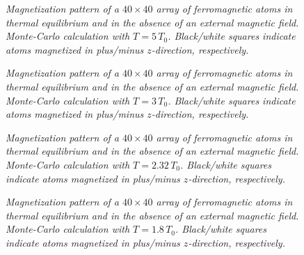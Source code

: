 \begin{figure}
\epsfysize=2in
\centerline{}
\caption{\em   Magnetization pattern of a $40\times 40$ array of ferromagnetic atoms in thermal
equilibrium and in the absence of an external magnetic field. Monte-Carlo calculation with $T=5\,T_0$.
Black/white squares indicate atoms magnetized in plus/minus $z$-direction, respectively.}
\end{figure}

\begin{figure}
\epsfysize=2in
\centerline{}
\caption{\em  Magnetization pattern of a $40\times 40$ array of ferromagnetic atoms in thermal
equilibrium and in the absence of an external magnetic field. Monte-Carlo calculation with $T=3\,T_0$.
Black/white squares indicate atoms magnetized in plus/minus $z$-direction, respectively.}
\end{figure}

\begin{figure}
\epsfysize=2in
\centerline{}
\caption{\em    Magnetization pattern of a $40\times 40$ array of ferromagnetic atoms in thermal
equilibrium and in the absence of an external magnetic field. Monte-Carlo calculation with $T=2.32\,T_0$.
Black/white squares indicate atoms magnetized in plus/minus $z$-direction, respectively.}
\end{figure}

\begin{figure}
\epsfysize=2in
\centerline{}
\caption{\em   Magnetization pattern of a $40\times 40$ array of ferromagnetic atoms in thermal
equilibrium and in the absence of an external magnetic field. Monte-Carlo calculation with $T=1.8\,T_0$.
Black/white squares indicate atoms magnetized in plus/minus $z$-direction, respectively.}\label{image5}
\end{figure}